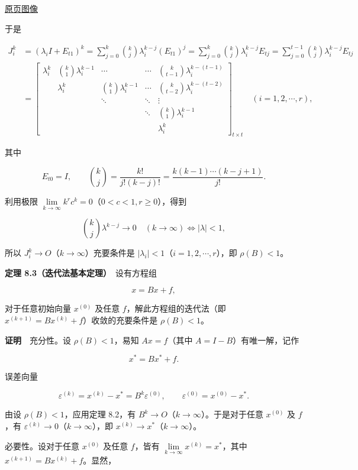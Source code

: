\documentclass[
  10pt,
  fontset=fandol]{ctexart}
\begin{document}
\href{../../source-images/pdf-221.jpeg}{原页图像}

于是

\[
\begin{aligned}
J_i^k&=(\lambda_i I+E_{t1})^k
=\sum_{j=0}^k\binom{k}{j}\lambda_i^{k-j}(E_{t1})^j
=\sum_{j=0}^k\binom{k}{j}\lambda_i^{k-j}E_{tj}
=\sum_{j=0}^{t-1}\binom{k}{j}\lambda_i^{k-j}E_{tj}\\[6pt]
&=\begin{bmatrix}
\lambda_i^k&\binom{k}{1}\lambda_i^{k-1}&\cdots&\cdots&\binom{k}{t-1}\lambda_i^{k-(t-1)}\\[5pt]
&\lambda_i^k&\binom{k}{1}\lambda_i^{k-1}&\cdots&\binom{k}{t-2}\lambda_i^{k-(t-2)}\\[5pt]
&&\ddots&\ddots&\vdots\\[5pt]
&&&\ddots&\binom{k}{1}\lambda_i^{k-1}\\[5pt]
&&&&\lambda_i^k
\end{bmatrix}_{t\times t}\quad(i=1,2,\cdots,r),
\end{aligned}
\]

其中

\[
E_{t0}=I,\qquad\binom{k}{j}=\frac{k!}{j!(k-j)!}=\frac{k(k-1)\cdots(k-j+1)}{j!}.
\]

利用极限 \(\lim\limits_{k\to\infty}k^r c^k=0\)（\(0<c<1,r\geqslant0\)），得到

\[
\binom{k}{j}\lambda^{k-j}\to0\quad(k\to\infty)\iff|\lambda|<1,
\]

所以 \(J_i^k\to O\)（\(k\to\infty\)）充要条件是 \(|\lambda_i|<1\)（\(i=1,2,\cdots,r\)），即 \(\rho(B)<1\)。

\textbf{定理 8.3（迭代法基本定理）}　设有方程组

\[
x=Bx+f,
\tag{8.3.1}
\]

对于任意初始向量 \(x^{(0)}\) 及任意 \(f\)，解此方程组的迭代法（即 \(x^{(k+1)}=Bx^{(k)}+f\)）收敛的充要条件是 \(\rho(B)<1\)。

\textbf{证明}　充分性。设 \(\rho(B)<1\)，易知 \(Ax=f\)（其中 \(A=I-B\)）有唯一解，记作

\[
x^*=Bx^*+f.
\tag{8.3.2}
\]

误差向量

\[
\varepsilon^{(k)}=x^{(k)}-x^*=B^k\varepsilon^{(0)},\qquad\varepsilon^{(0)}=x^{(0)}-x^*.
\]

由设 \(\rho(B)<1\)，应用定理 8.2，有 \(B^k\to O\)（\(k\to\infty\)）。于是对于任意 \(x^{(0)}\) 及 \(f\)，有 \(\varepsilon^{(k)}\to0\)（\(k\to\infty\)），即 \(x^{(k)}\to x^*\)（\(k\to\infty\)）。

必要性。设对于任意 \(x^{(0)}\) 及任意 \(f\)，皆有 \(\lim\limits_{k\to\infty}x^{(k)}=x^*\)，其中 \(x^{(k+1)}=Bx^{(k)}+f\)。显然，
\end{document}
